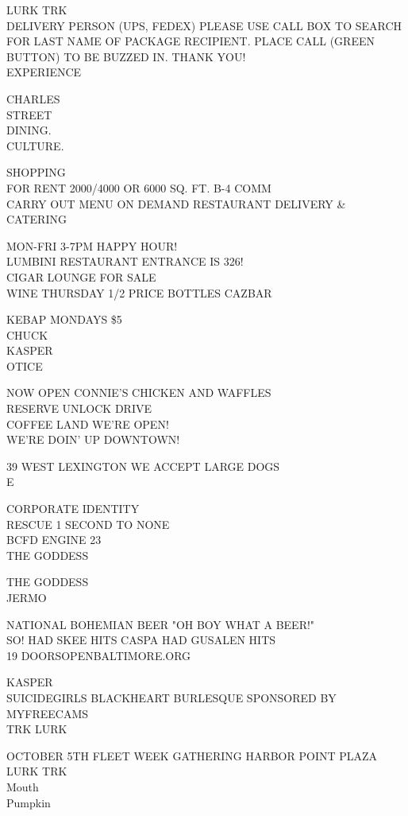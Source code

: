 \documentclass[10pt,letterpaper]{article}
\begin{document}
LURK TRK\\
DELIVERY PERSON (UPS, FEDEX) PLEASE USE CALL BOX TO SEARCH FOR LAST NAME OF PACKAGE RECIPIENT.  PLACE CALL (GREEN BUTTON) TO BE BUZZED IN.  THANK YOU!\\
EXPERIENCE

CHARLES\\
STREET\\
DINING.\\
CULTURE.

SHOPPING\\
FOR RENT 2000/4000 OR 6000 SQ. FT. B{-}4 COMM\\
CARRY OUT MENU ON DEMAND RESTAURANT DELIVERY \& CATERING

MON{-}FRI 3{-}7PM HAPPY HOUR!\\
LUMBINI RESTAURANT ENTRANCE IS 326!\\
CIGAR LOUNGE FOR SALE\\
WINE THURSDAY 1/2 PRICE BOTTLES CAZBAR

KEBAP MONDAYS \$5\\
CHUCK\\
KASPER\\
OTICE

NOW OPEN CONNIE'S CHICKEN AND WAFFLES\\
RESERVE UNLOCK DRIVE\\
COFFEE LAND WE'RE OPEN!\\
WE'RE DOIN' UP DOWNTOWN!

39 WEST LEXINGTON WE ACCEPT LARGE DOGS\\
E

CORPORATE IDENTITY\\
RESCUE 1 SECOND TO NONE\\
BCFD ENGINE 23\\
THE GODDESS

THE GODDESS\\
JERMO

NATIONAL BOHEMIAN BEER "OH BOY WHAT A BEER!"\\
SO!  HAD SKEE HITS CASPA HAD GUSALEN HITS\\
19 DOORSOPENBALTIMORE.ORG

KASPER\\
SUICIDEGIRLS BLACKHEART BURLESQUE SPONSORED BY MYFREECAMS\\
TRK LURK

OCTOBER 5TH FLEET WEEK GATHERING HARBOR POINT PLAZA\\
LURK TRK\\
Mouth\\
Pumpkin
\end{document}
